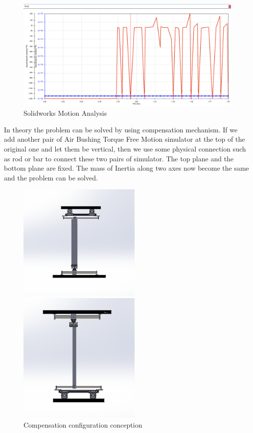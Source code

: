 \begin{figure}[H]
\centering
\includegraphics[width=\linewidth]{fig/DOE/MotionAnalysis}
\caption{Solidworks Motion Analysis}\label{Resulte of analysis} 
\end{figure} 

In theory the problem can be solved by using compensation mechanism. If we add another pair of Air Bushing Torque Free Motion simulator at the top of the original one and let them be vertical, then we use some physical connection such as rod or bar to connect these two pairs of simulator. The top plane and the bottom plane are fixed. The mass of Inertia along two axes now become the same and the problem can be solved. 

\begin{figure}[H]
\centering
\begin{minipage}[t]{0.48\textwidth}
\centering
\includegraphics[width=6cm]{fig/DOE/FrontView}
\end{minipage}
\begin{minipage}[t]{0.48\textwidth}
\centering
\includegraphics[width=6cm]{fig/DOE/RightView}
\end{minipage}
\caption{Compensation configuration conception}
\end{figure}

